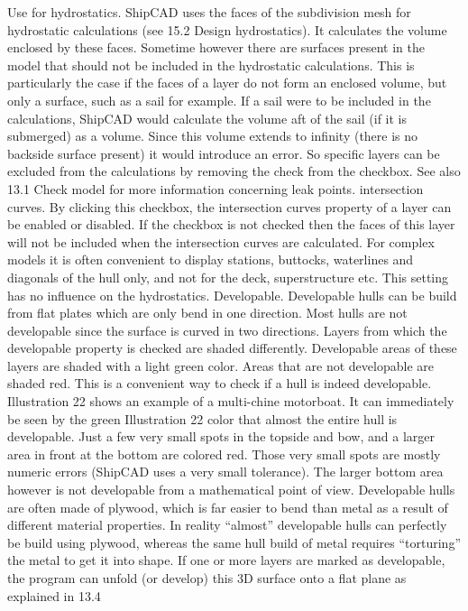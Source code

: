 \documentclass[12pt]{article}
\begin{document}
Use for hydrostatics.
ShipCAD uses the faces of the subdivision mesh for hydrostatic calculations (see 15.2
Design hydrostatics). It calculates the volume enclosed by these faces. Sometime however
there are surfaces present in the model that should not be included in the hydrostatic
calculations. This is particularly the case if the faces of a layer do not form an enclosed
volume, but only a surface, such as a sail for example. If a sail were to be included in the
calculations, ShipCAD would calculate the volume aft of the sail (if it is submerged) as a
volume. Since this volume extends to infinity (there is no backside surface present) it would
introduce an error. So specific layers can be excluded from the calculations by removing the
check from the checkbox. See also 13.1 Check model for more information concerning leak
points.
intersection curves.
By clicking this checkbox, the intersection curves property of a layer can be enabled or
disabled. If the checkbox is not checked then the faces of this layer will not be included
when the intersection curves are calculated. For complex models it is often convenient to
display stations, buttocks, waterlines and diagonals of the hull only, and not for the deck,
superstructure etc. This setting has no influence on the hydrostatics.
Developable.
Developable hulls can be build
from flat plates which are only
bend in one direction. Most hulls
are not developable since the
surface is curved in two directions.
Layers from which the developable
property is checked are shaded
differently. Developable areas of
these layers are shaded with a light
green color. Areas that are not
developable are shaded red. This
is a convenient way to check if a
hull is indeed developable.
Illustration 22 shows an example of
a multi-chine motorboat. It can
immediately be seen by the green
Illustration 22
color that almost the entire hull is
developable. Just a few very small spots in the topside and bow, and a larger area in front at
the bottom are colored red. Those very small spots are mostly numeric errors (ShipCAD
uses a very small tolerance). The larger bottom area however is not developable from a
mathematical point of view. Developable hulls are often made of plywood, which is far easier
to bend than metal as a result of different material properties. In reality “almost” developable
hulls can perfectly be build using plywood, whereas the same hull build of metal requires
“torturing” the metal to get it into shape. If one or more layers are marked as developable,
the program can unfold (or develop) this 3D surface onto a flat plane as explained in 13.4
\end{document}
